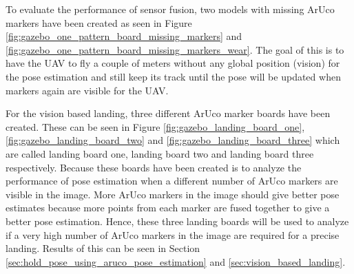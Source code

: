 \documentclass[../Head/report.tex]{subfiles}
\begin{document}
To evaluate the performance of sensor fusion, two models with missing ArUco markers have been created as seen in Figure \ref{fig:gazebo_one_pattern_board_missing_markers} and \ref{fig:gazebo_one_pattern_board_missing_markers_wear}. The goal of this is to have the UAV to fly a couple of meters without any global position (vision) for the pose estimation and still keep its track until the pose will be updated when markers again are visible for the UAV.

For the vision based landing, three different ArUco marker boards have been created. These can be seen in Figure \ref{fig:gazebo_landing_board_one}, \ref{fig:gazebo_landing_board_two} and \ref{fig:gazebo_landing_board_three} which are called landing board one, landing board two and landing board three respectively. Because these boards have been created is to analyze the performance of pose estimation when a different number of ArUco markers are visible in the image. More ArUco markers in the image should give better pose estimates because more points from each marker are fused together to give a better pose estimation. Hence, these three landing boards will be used to analyze if a very high number of ArUco markers in the image are required for a precise landing. Results of this can be seen in Section \ref{sec:hold_pose_using_aruco_pose_estimation} and \ref{sec:vision_based_landing}. 
\end{document}
